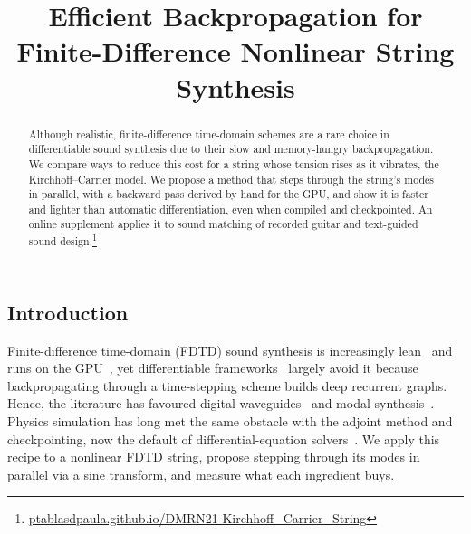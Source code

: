 \documentclass[a4paper]{article}
\title{Efficient Backpropagation for\\Finite-Difference Nonlinear String Synthesis}
\begin{document}
\ninept
\maketitle
\begin{sloppy}
\begin{abstract}
Although realistic, finite-difference time-domain schemes are a rare choice
in differentiable sound synthesis due to their slow and memory-hungry
backpropagation. We compare ways to reduce this cost for a string whose
tension rises as it vibrates, the Kirchhoff--Carrier model. We propose a
method that steps through the string's modes in parallel, with a backward
pass derived by hand for the GPU, and show it is faster and lighter than
automatic differentiation, even when compiled and checkpointed. An online
supplement applies it to sound matching of recorded guitar and
text-guided sound design.\footnote{\fontsize{6}{7}\selectfont\url{ptablasdpaula.github.io/DMRN21-Kirchhoff_Carrier_String}}
\end{abstract}

\section{Introduction}
Finite-difference time-domain (FDTD) sound synthesis is increasingly lean~\cite{bilbao2024guitar} and runs on the GPU~\cite{lee2024string}, yet differentiable
frameworks~\cite{hayes2024review} largely avoid it because
backpropagating through a time-stepping scheme builds deep recurrent graphs. Hence, the literature has favoured
digital waveguides~\cite{tablas2026sound} and modal
synthesis~\cite{diaz2025}. Physics simulation has long met the same obstacle
with the adjoint method and checkpointing, now the default of
differential-equation solvers~\cite{kidger2021}.
We apply this recipe to a nonlinear FDTD string, propose stepping through
its modes in parallel via a sine transform, and measure what each
ingredient buys.


\end{sloppy}
\end{document}
